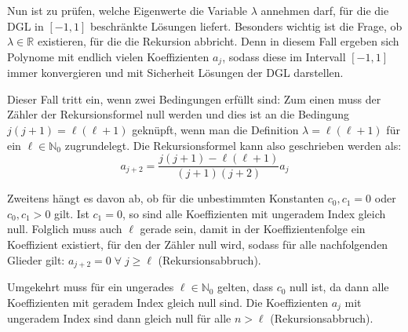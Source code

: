 \documentclass[9pt]{report}
\begin{document}
Nun ist zu prüfen, welche Eigenwerte die Variable $\lambda$ annehmen darf, für die die DGL in $[-1,1]$ beschränkte Lösungen liefert. Besonders wichtig ist die Frage, ob $\lambda\in\mathbb{R}$ existieren, für die die Rekursion abbricht. Denn in diesem Fall ergeben sich Polynome mit endlich vielen Koeffizienten $a_{j}$, sodass diese im Intervall $[-1,1]$ immer konvergieren und mit Sicherheit Lösungen der DGL darstellen.

Dieser Fall tritt ein, wenn zwei Bedingungen erfüllt sind: Zum einen muss der Zähler der Rekursionsformel null werden und dies ist an die Bedingung $j(j+1)=\ell(\ell+1)$ geknüpft, wenn man die Definition $\lambda=\ell(\ell+1)$ für ein $\ell\in\mathbb{N}_0$ zugrundelegt. Die Rekursionsformel kann also geschrieben werden als:
\begin{equation}
a_{j+2}=\frac{j(j+1)-\ell(\ell+1)}{(j+1)(j+2)}a_{j}
\end{equation}

Zweitens hängt es davon ab, ob für die unbestimmten Konstanten $c_0,c_1=0$ oder $c_0,c_1>0$ gilt. Ist $c_1=0$, so sind alle Koeffizienten mit ungeradem Index gleich null. Folglich muss auch $\ell$ gerade sein, damit in der Koeffizientenfolge ein Koeffizient existiert, für den der Zähler null wird, sodass für alle nachfolgenden Glieder gilt: $a_{j+2}=0\;\forall\;j\geq\ell$ (Rekursionsabbruch).

Umgekehrt muss für ein ungerades $\ell\in\mathbb{N}_0$ gelten, dass $c_0$ null ist, da dann alle Koeffizienten mit geradem Index gleich null sind. Die Koeffizienten $a_j$ mit ungeradem Index sind dann gleich null für alle $n>\ell$ (Rekursionsabbruch).
\end{document}
